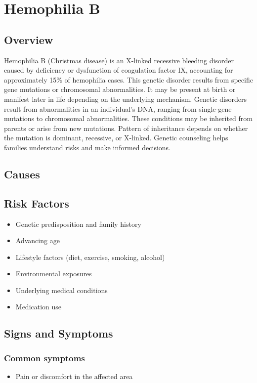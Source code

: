 \chapter{Hemophilia B}
\label{sec:Hemophilia B}

\section{Overview}
Hemophilia B (Christmas disease) is an X-linked recessive bleeding disorder caused by deficiency or dysfunction of coagulation factor IX, accounting for approximately 15\% of hemophilia cases. This genetic disorder results from specific gene mutations or chromosomal abnormalities. It may be present at birth or manifest later in life depending on the underlying mechanism. Genetic disorders result from abnormalities in an individual's DNA, ranging from single-gene mutations to chromosomal abnormalities. These conditions may be inherited from parents or arise from new mutations. Pattern of inheritance depends on whether the mutation is dominant, recessive, or X-linked. Genetic counseling helps families understand risks and make informed decisions.
\section{Causes}
\section{Risk Factors}

\begin{itemize}[noitemsep]
  \item Genetic predisposition and family history
  \item Advancing age
  \item Lifestyle factors (diet, exercise, smoking, alcohol)
  \item Environmental exposures
  \item Underlying medical conditions
  \item Medication use
\end{itemize}
\section{Signs and Symptoms}

\subsection{Common symptoms}
\begin{itemize}[noitemsep]
  \item Pain or discomfort in the affected area
  \end{itemize}


